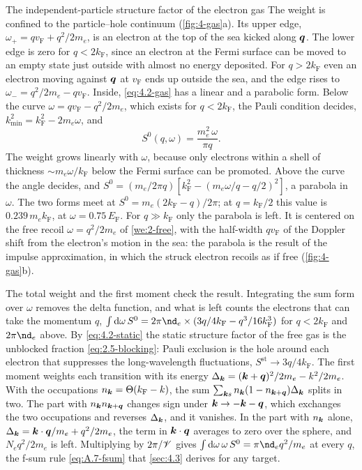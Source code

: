 \begin{workedexample}{The independent-particle structure factor of the electron gas}
The weight is confined to the particle--hole continuum (\cref{fig:4-gas}a). Its upper edge, $\omega_+ = qv_{\mathrm{F}} + q^2/2m_e$, is an electron at the top of the sea kicked along $\bm{q}$. The lower edge is zero for $q < 2k_{\mathrm{F}}$, since an electron at the Fermi surface can be moved to an empty state just outside with almost no energy deposited. For $q > 2k_{\mathrm{F}}$ even an electron moving against $\bm{q}$ at $v_{\mathrm{F}}$ ends up outside the sea, and the edge rises to $\omega_- = q^2/2m_e - qv_{\mathrm{F}}$. Inside, \cref{eq:4.2-gas} has a linear and a parabolic form. Below the curve $\omega = qv_{\mathrm{F}} - q^2/2m_e$, which exists for $q < 2k_{\mathrm{F}}$, the Pauli condition decides, $k_{\mathrm{min}}^2 = k_{\mathrm{F}}^2 - 2m_e\omega$, and
\begin{equation*}
  S^0(q,\omega) = \frac{m_e^2\,\omega}{\pi q} .
\end{equation*}
The weight grows linearly with $\omega$, because only electrons within a shell of thickness $\sim m_e\omega/k_{\mathrm{F}}$ below the Fermi surface can be promoted. Above the curve the angle decides, and $S^0 = (m_e/2\pi q)[k_{\mathrm{F}}^2 - (m_e\omega/q - q/2)^2]$, a parabola in $\omega$. The two forms meet at $S^0 = m_e(2k_{\mathrm{F}} - q)/2\pi$; at $q = k_{\mathrm{F}}/2$ this value is $0.239\,m_ek_{\mathrm{F}}$, at $\omega = 0.75\,E_{\mathrm{F}}$. For $q \gg k_{\mathrm{F}}$ only the parabola is left. It is centered on the free recoil $\omega = q^2/2m_e$ of \cref{we:2-free}, with the half-width $qv_{\mathrm{F}}$ of the Doppler shift from the electron's motion in the sea: the parabola is the result of the impulse approximation, in which the struck electron recoils as if free (\cref{fig:4-gas}b).

The total weight and the first moment check the result. Integrating the sum form over $\omega$ removes the delta function, and what is left counts the electrons that can take the momentum $q$, $\int\dd\omega\,S^0 = 2\pi\nd_e\times(3q/4k_{\mathrm{F}} - q^3/16k_{\mathrm{F}}^3)$ for $q < 2k_{\mathrm{F}}$ and $2\pi\nd_e$ above. By \cref{eq:4.2-static} the static structure factor of the free gas is the unblocked fraction \cref{eq:2.5-blocking}: Pauli exclusion is the hole around each electron that suppresses the long-wavelength fluctuations, $S^{\mathrm{st}} \to 3q/4k_{\mathrm{F}}$. The first moment weights each transition with its energy $\Delta_{\bm{k}} = (\bm{k} + \bm{q})^2/2m_e - k^2/2m_e$. With the occupations $n_{\bm{k}} = \Theta(k_{\mathrm{F}} - k)$, the sum $\sum_{\bm{k}s}n_{\bm{k}}(1 - n_{\bm{k}+\bm{q}})\Delta_{\bm{k}}$ splits in two. The part with $n_{\bm{k}}n_{\bm{k}+\bm{q}}$ changes sign under $\bm{k} \to -\bm{k} - \bm{q}$, which exchanges the two occupations and reverses $\Delta_{\bm{k}}$, and it vanishes. In the part with $n_{\bm{k}}$ alone, $\Delta_{\bm{k}} = \bm{k}\cdot\bm{q}/m_e + q^2/2m_e$, the term in $\bm{k}\cdot\bm{q}$ averages to zero over the sphere, and $N_eq^2/2m_e$ is left. Multiplying by $2\pi/\mathscr{V}$ gives $\int\dd\omega\,\omega\,S^0 = \pi\nd_eq^2/m_e$ at every $q$, the f-sum rule \cref{eq:A.7-fsum} that \cref{sec:4.3} derives for any target.


\end{workedexample}
